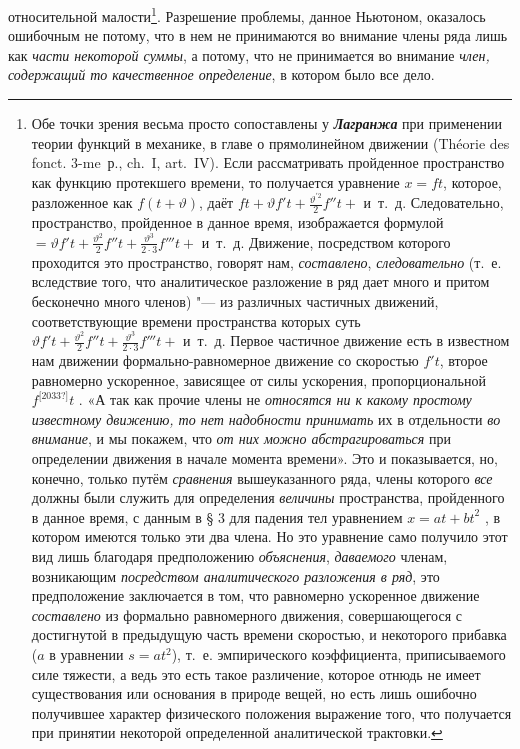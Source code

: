 относительной малости\footnote{
Обе точки зрения весьма просто
сопоставлены у {\em\bfseries Лагранжа} при
применении теории функций в механике, в главе о прямолинейном движении
(Théorie des fonct. 3-me~р., ch.~I, art.~IV). Если
рассматривать пройденное пространство как функцию протекшего времени, то
получается уравнение $x=\mathit{ft}$, которое, разложенное
как $f(t+\vartheta )$, даёт
$\mathit{ft} + \vartheta f't + \frac{\vartheta ^{'2}} 2 f''t + $
и~т.~д. Следовательно, пространство, пройденное в данное время,
изображается формулой
$ = \vartheta f't+\frac{\vartheta ^2}
2 f''t + \frac{\vartheta ^3}{2 \cdot 3} f'''t + $
и~т.~д. Движение, посредством которого проходится это
пространство, говорят нам, {\em составлено}, {\em следовательно} (т.~е.
вследствие того, что аналитическое разложение в ряд дает много и притом
бесконечно много членов) "--- из различных частичных движений,
соответствующие времени пространства которых суть
$ \vartheta f't+\frac{\vartheta ^2}
2 f''t + \frac{\vartheta ^3}{2 \cdot 3} f'''t + $
и~т.~д. Первое частичное
движение есть в известном нам движении формально-равномерное движение со
скоростью $f't$, второе равномерно ускоренное, зависящее
от силы ускорения, пропорциональной $f^{\text{[2033?]}}t$ .
«А так как прочие члены не {\em относятся ни к какому простому
известному движению, то нет надобности принимать} их в
отдельности {\em во внимание}, и мы покажем, что
{\em от них можно абстрагироваться} при определении движения в
начале момента времени». Это и показывается, но, конечно, только путём
{\em сравнения} вышеуказанного ряда, члены которого {\em все} должны были
служить для определения {\em величины}
пространства, пройденного в данное время, с данным в § 3 для
падения тел уравнением $x=\mathit{at}+\mathit{bt}^2$ , в
котором имеются только эти два члена. Но это уравнение само получило этот
вид лишь благодаря предположению {\em объяснения}, {\em даваемого} членам,
возникающим {\em посредством аналитического разложения в ряд},
это предположение заключается в том, что равномерно ускоренное движение
{\em составлено} из формально равномерного движения, совершающегося
с достигнутой в предыдущую часть времени скоростью, и некоторого прибавка
($a$ в уравнении $s=at^2$), т.~е. эмпирического коэффициента,
приписываемого силе тяжести, а ведь это есть такое различение, которое
отнюдь не имеет существования или основания в природе вещей, но есть лишь
ошибочно получившее характер физического положения выражение того, что
получается при принятии некоторой определенной аналитической трактовки.}.
Разрешение проблемы, данное Ньютоном, оказалось ошибочным не потому, что в
нем не принимаются во внимание члены ряда лишь как
{\em части некоторой суммы}, а потому, что не
принимается во внимание {\em член, содержащий то
качественное определение}, в котором было все дело.

